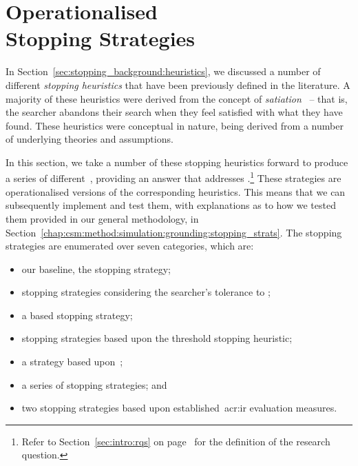 
\chapter[Operationalised Stopping Strategies]{Operationalised\\Stopping Strategies}\label{chap:strategies}
In Section~\ref{sec:stopping_background:heuristics}, we discussed a number of different \emph{stopping heuristics} that have been previously defined in the literature. A majority of these heuristics were derived from the concept of \emph{satiation}~\citep{simon1955satiation} -- that is, the searcher abandons their search when they feel satisfied with what they have found. These heuristics were conceptual in nature, being derived from a number of underlying theories and assumptions.

In this section, we take a number of these stopping heuristics forward to produce a series of different~, providing an answer that addresses .\footnote{Refer to Section~\ref{sec:intro:rqs} on page~\pageref{sec:intro:rqs} for the definition of the research question.} These strategies are operationalised versions of the corresponding heuristics. This means that we can subsequently implement and test them, with explanations as to how we tested them provided in our general methodology, in Section~\ref{chap:csm:method:simulation:grounding:stopping_strats}. The stopping strategies are enumerated over seven categories, which are:

\begin{itemize}
    \item{our baseline, the  stopping strategy;}
    \item{stopping strategies considering the searcher's tolerance to ;}
    \item{a  based stopping strategy;}
    \item{stopping strategies based upon the  threshold stopping heuristic;}
    \item{a strategy based upon~;}
    \item{a series of  stopping strategies; and}
    \item{two stopping strategies based upon established~\gls{acr:ir} evaluation measures.}
\end{itemize}

